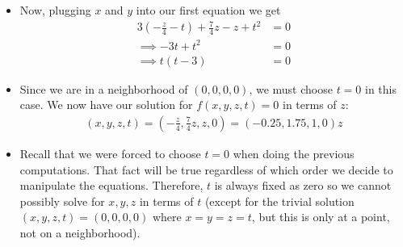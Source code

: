 \documentclass[10pt,a4paper]{article}
\theoremstyle{definition}
\theoremstyle{definition}
\numberwithin{equation}{section}
\begin{document}
\begin{enumerate}[label = (\alph*)]
\begin{itemize}
	\item Now, plugging $x$ and $y$ into our first equation we get
	\begin{align*}
	3\left(-\frac{z}{4} - t\right) + \frac{7}{4}z - z + t^2 &= 0\\
	\implies -3t + t^2 &= 0\\
	\implies t(t - 3) &= 0
	\end{align*}
	\item Since we are in a neighborhood of $(0,0,0,0)$, we must choose $t = 0$ in this case. We now have our solution for $f(x, y, z, t) = 0$ in terms of $z$:
	\begin{align*}
	(x, y, z, t) = \left(-\frac{z}{4}, \frac{7}{4}z, z, 0\right) = (-0.25, 1.75, 1, 0)z
	\end{align*}
	\item Recall that we were forced to choose $t = 0$ when doing the previous computations. That fact will be true regardless of which order we decide to manipulate the equations. Therefore, $t$ is always fixed as zero so we cannot possibly solve for $x, y, z$ in terms of $t$ (except for the trivial solution $(x, y, z, t) = (0,0,0,0)$ where $x = y = z = t$, but this is only at a point, not on a neighborhood). 
	\end{itemize}
\end{enumerate}
\end{document}

